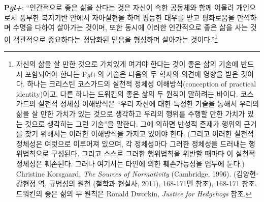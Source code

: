 
\begin{highlightbox}
\textbf{P\emph{gl+}}: ``인간적으로 좋은 삶을 산다는 것은 자신이 속한 공동체와 함께 어울려 개인으로서 풍부한 복지기반 안에서 자아실현을 하며 평등한 대우를 받고 평화로움을 만끽하며 수명을 다하여 살아가는 것이며, 또한 동시에 이러한 인간적으로 좋은 삶을 사는 것이 객관적으로 중요하다는 정당화된 믿음을 형성하며 살아가는 것이다.''\footnote{자신의 삶을 살 만한 것으로 가치있게 여겨야 한다는 것이 좋은 삶의 기술에 반드시 포함되어야 한다는 P\emph{gl}+의 기술은 다음의 두 학자의 의견에 영향을 받은 것이다. 하나는 크리스틴 코스가드의 실천적 정체성 이해방식(conception of practical identity)이고, 다른 하나는 드워킨의 좋은 삶의 두 원칙이 말하려는 바이다. 코스가드의 실천적 정체성 이해방식은 ``우리 자신에 대한 특정한 기술을 통해서 우리의 삶을 살 만한 가치가 있는 것으로 생각하고 우리의 행위를 수행할 만한 가치가 있는 것으로 생각하는 그런 기술''을 말한다. 그에 의하면 반성적 존재가 행위의 근거를 찾기 위해서는 이러한 이해방식을 가지고 있어야 한다. (그리고 이러한 실천적 정체성은 여럿으로 이루어져 있으며, 각 정체성마다 그러한 정체성을 드러내는 행위법칙으로 구성된다. 그리고 스스로 그러한 행위법칙을 위반할 때마다 이 실천적 정체성은 훼손된다. 그러나 여기서는 타인에 의한 훼손가능성을 염두에 둔다.) Christine Korsgaard, \emph{The Sources of Normativity} (Cambridge, 1996). (김양현⋅강현정 역, 규범성의 원천 (철학과 현실사, 2011), 168-171면 참조), 168-171 참조. 드워킨의 좋은 삶의 두 원칙은 Ronald Dworkin, \emph{Justice for Hedgehogs} 참조.}
\end{highlightbox}

